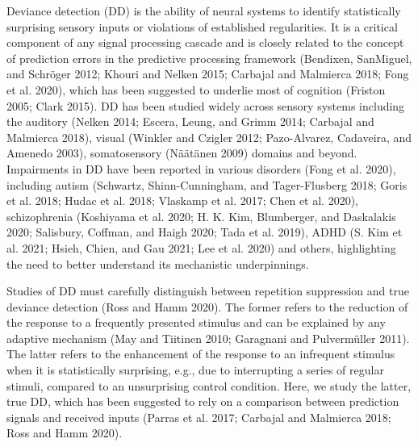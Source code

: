 \documentclass[pdflatex,referee,iicol,sn-basic]{sn-jnl}
\begin{document}
Deviance detection (DD) is the ability of neural systems to identify statistically surprising sensory inputs or violations of established regularities. It is a critical component of any signal processing cascade and is closely related to the concept of prediction errors in the predictive processing framework (Bendixen, SanMiguel, and Schröger 2012; Khouri and Nelken 2015; Carbajal and Malmierca 2018; Fong et al. 2020), which has been suggested to underlie most of cognition (Friston 2005; Clark 2015). DD has been studied widely across sensory systems including the auditory (Nelken 2014; Escera, Leung, and Grimm 2014; Carbajal and Malmierca 2018), visual (Winkler and Czigler 2012; Pazo-Alvarez, Cadaveira, and Amenedo 2003), somatosensory (Näätänen 2009) domains and beyond. Impairments in DD have been reported in various disorders (Fong et al. 2020), including autism (Schwartz, Shinn-Cunningham, and Tager-Flusberg 2018; Goris et al. 2018; Hudac et al. 2018; Vlaskamp et al. 2017; Chen et al. 2020), schizophrenia (Koshiyama et al. 2020; H. K. Kim, Blumberger, and Daskalakis 2020; Salisbury, Coffman, and Haigh 2020; Tada et al. 2019), ADHD (S. Kim et al. 2021; Hsieh, Chien, and Gau 2021; Lee et al. 2020) and others, highlighting the need to better understand its mechanistic underpinnings.

Studies of DD must carefully distinguish between repetition suppression and true deviance detection (Ross and Hamm 2020). The former refers to the reduction of the response to a frequently presented stimulus and can be explained by any adaptive mechanism (May and Tiitinen 2010; Garagnani and Pulvermüller 2011). The latter refers to the enhancement of the response to an infrequent stimulus when it is statistically surprising, e.g., due to interrupting a series of regular stimuli, compared to an unsurprising control condition. Here, we study the latter, true DD, which has been suggested to rely on a comparison between prediction signals and received inputs (Parras et al. 2017; Carbajal and Malmierca 2018; Ross and Hamm 2020). 
\end{document}
